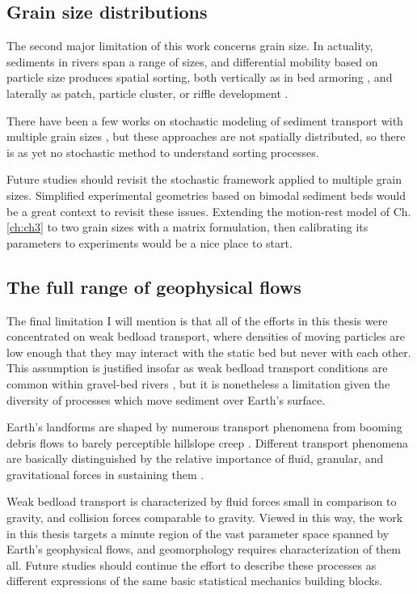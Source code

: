 \subsection{Grain size distributions}

The second major limitation of this work concerns grain size.
In actuality, sediments in rivers span a range of sizes, and differential mobility based on particle size produces spatial sorting, both vertically as in bed armoring \citep{Parker1982,Wilcock1989,Aberle2006}, and laterally as patch, particle cluster, or riffle development \citep{Nelson2014,Venditti2017}.

There have been a few works on stochastic modeling of sediment transport with multiple grain sizes \citep{Sun2000,Parker2000}, but these approaches are not spatially distributed, so there is as yet no stochastic method to understand sorting processes. 

Future studies should revisit the stochastic framework applied to multiple grain sizes. Simplified experimental geometries based on bimodal sediment beds \citep[e.g.][]{Houssais2012} would be a great context to revisit these issues. Extending the motion-rest model of Ch. \ref{ch:ch3} to two grain sizes with a matrix formulation, then calibrating its parameters to experiments would be a nice place to start.

\subsection{The full range of geophysical flows}

The final limitation I will mention is that all of the efforts in this thesis were concentrated on weak bedload transport, where densities of moving particles are low enough that they may interact with the static bed but never with each other. This assumption is justified insofar as weak bedload transport conditions are common within gravel-bed rivers \citep{Ashworth1989,Warburton1992}, but it is nonetheless a limitation given the diversity of processes which move sediment over Earth's surface.

Earth's landforms are shaped by numerous transport phenomena from booming debris flows \citep{Iverson1997} to barely perceptible hillslope creep \citep{Deshpande2021}.
Different transport phenomena are basically distinguished by the relative importance of fluid, granular, and gravitational forces in sustaining them \citep{Jerolmack2019}.

Weak bedload transport is characterized by fluid forces small in comparison to gravity, and collision forces comparable to gravity.
Viewed in this way, the work in this thesis targets a minute region of the vast parameter space spanned by Earth's geophysical flows, and geomorphology requires characterization of them all.
Future studies should continue the effort \citep[e.g.][]{Furbish2021a} to describe these processes as different expressions of the same basic statistical mechanics building blocks.

